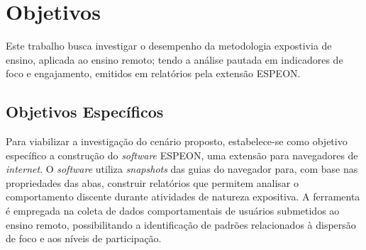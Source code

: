 \section{Objetivos}
Este trabalho busca investigar o desempenho da metodologia expostivia de ensino, aplicada ao ensino remoto; tendo a análise pautada em indicadores de foco e engajamento, emitidos em relatórios pela extensão ESPEON.

\subsection{Objetivos Específicos}
Para viabilizar a investigação do cenário proposto, estabelece-se como objetivo específico a construção do \textit{software} ESPEON, uma extensão para navegadores de \textit{internet}. O \textit{software} utiliza \textit{snapshots} das guias do navegador para, com base nas propriedades das abas, construir relatórios que permitem analisar o comportamento discente durante atividades de natureza expositiva. A ferramenta é empregada na coleta de dados comportamentais de usuários submetidos ao ensino remoto, possibilitando a identificação de padrões relacionados à dispersão de foco e aos níveis de participação.
